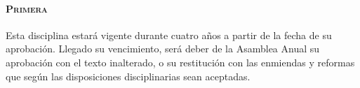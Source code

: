 
\paragraph{\textsc{Primera}}
Esta disciplina estará vigente durante cuatro años a partir de la fecha de su aprobación. Llegado su vencimiento, será deber de la Asamblea Anual su aprobación con el texto inalterado, o su restitución con las enmiendas y reformas que según las disposiciones disciplinarias sean aceptadas.
